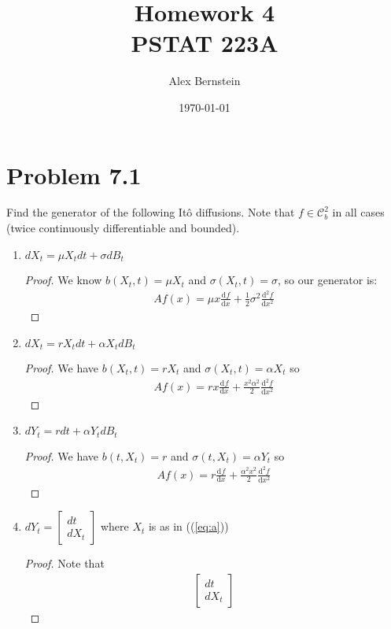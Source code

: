 \documentclass[11pt]{article}
\date{\today}
\newcommand{\ga}{\alpha}
\newcommand{\gs}{\sigma}
\newcommand{\mrm}{\mathrm}
\newcommand{\diff}{\mrm{d}}
\newcommand{\deriv}[3][]{%
  \ensuremath{\frac{\diff^{#1} {#2}}{\diff {#3}^{#1}}}}
\let\oldref\ref
\renewcommand{\ref}[1]{(\oldref{#1})}
\begin{document}
\title{Homework 4 \\ \large PSTAT 223A \vspace{-2ex}}
\author{Alex Bernstein \vspace{-2ex}}
\maketitle
\section*{Problem 7.1}
Find the generator of the following It\^o diffusions.  Note that $f \in \mathcal{C}^2_b$ in all cases (twice continuously differentiable and bounded).
\begin{enumerate}
\item $d X _ { t } = \mu X _ { t } d t + \sigma d B _ { t }$ \label{eq:a}
\begin{proof}
We know $b(X_t,t)=\mu X_t$ and $\gs(X_t,t)=\gs$, so our generator is:
\begin{align*}
Af(x) = \mu x \deriv{f}{x} +\frac{1}{2}\gs^2 \deriv[2]{f}{x}
\end{align*}
\end{proof}
\item $d X _ { t } = r X _ { t } d t + \alpha X _ { t } d B _ { t }$
\begin{proof}
We have $b(X_t,t)=rX_t $ and $\gs(X_t,t)= \ga X_t$ so
\begin{align*}
Af(x) = rx \deriv{f}{x} + \frac{x^2\ga^2}{2} \deriv[2]{f}{x}
\end{align*}
\end{proof}
\item$d Y _ { t } = r d t + \alpha Y _ { t } d B _ { t }$
\begin{proof}
We have $b(t,X_t)=r$ and $\gs(t,X_t)=\ga Y_t$ so
\begin{align*}
Af(x) = r \deriv{f}{x} + \frac{\ga^2 x^2}{2} \deriv[2]{f}{x}
\end{align*}
\end{proof}
\item $d Y _ { t } = \left[ \begin{array} { c } { d t } \\ { d X _ { t } } \end{array} \right]$ where $X _ { t }$ is as in (\ref{eq:a})
\begin{proof}
Note that
\begin{align*}
\begin{bmatrix}
dt \\ dX_t

\end{bmatrix}
\end{align*}
\end{proof}
\end{enumerate}
\end{document}
